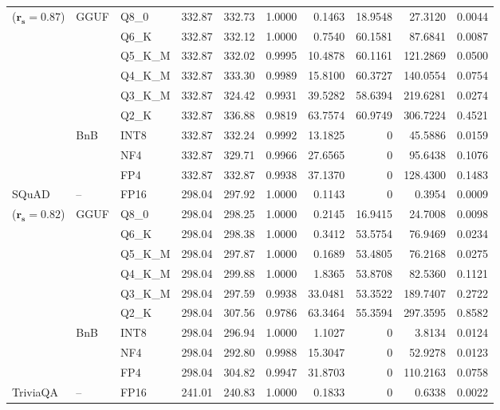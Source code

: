 \begin{longtable}{ll l rrrrrrr}
{\small ($\mathbf{r_s{=}0.87}$)} & GGUF & Q8\_0 & 332.87 & 332.73 & 1.0000 & 0.1463 & 18.9548 & 27.3120 & 0.0044 \\
 &  & Q6\_K & 332.87 & 332.12 & 1.0000 & 0.7540 & 60.1581 & 87.6841 & 0.0087 \\
 &  & Q5\_K\_M & 332.87 & 332.02 & 0.9995 & 10.4878 & 60.1161 & 121.2869 & 0.0500 \\
 &  & Q4\_K\_M & 332.87 & 333.30 & 0.9989 & 15.8100 & 60.3727 & 140.0554 & 0.0754 \\
 &  & Q3\_K\_M & 332.87 & 324.42 & 0.9931 & 39.5282 & 58.6394 & 219.6281 & 0.0274 \\
 &  & Q2\_K & 332.87 & 336.88 & 0.9819 & 63.7574 & 60.9749 & 306.7224 & 0.4521 \\
 & BnB & INT8 & 332.87 & 332.24 & 0.9992 & 13.1825 & \cellcolor{cyan!12} $0$ & 45.5886 & 0.0159 \\
 &  & NF4 & 332.87 & 329.71 & 0.9966 & 27.6565 & \cellcolor{cyan!12} $0$ & 95.6438 & 0.1076 \\
 &  & FP4 & 332.87 & 332.87 & 0.9938 & 37.1370 & \cellcolor{cyan!12} $0$ & 128.4300 & 0.1483 \\
\midrule
SQuAD & -- & FP16 & 298.04 & 297.92 & 1.0000 & 0.1143 & \cellcolor{cyan!12} $0$ & 0.3954 & 0.0009 \\
{\small ($\mathbf{r_s{=}0.82}$)} & GGUF & Q8\_0 & 298.04 & 298.25 & 1.0000 & 0.2145 & 16.9415 & 24.7008 & 0.0098 \\
 &  & Q6\_K & 298.04 & 298.38 & 1.0000 & 0.3412 & 53.5754 & 76.9469 & 0.0234 \\
 &  & Q5\_K\_M & 298.04 & 297.87 & 1.0000 & 0.1689 & 53.4805 & 76.2168 & 0.0275 \\
 &  & Q4\_K\_M & 298.04 & 299.88 & 1.0000 & 1.8365 & 53.8708 & 82.5360 & 0.1121 \\
 &  & Q3\_K\_M & 298.04 & 297.59 & 0.9938 & 33.0481 & 53.3522 & 189.7407 & 0.2722 \\
 &  & Q2\_K & 298.04 & 307.56 & 0.9786 & 63.3464 & 55.3594 & 297.3595 & 0.8582 \\
 & BnB & INT8 & 298.04 & 296.94 & 1.0000 & 1.1027 & \cellcolor{cyan!12} $0$ & 3.8134 & 0.0124 \\
 &  & NF4 & 298.04 & 292.80 & 0.9988 & 15.3047 & \cellcolor{cyan!12} $0$ & 52.9278 & 0.0123 \\
 &  & FP4 & 298.04 & 304.82 & 0.9947 & 31.8703 & \cellcolor{cyan!12} $0$ & 110.2163 & 0.0758 \\
\midrule
TriviaQA & -- & FP16 & 241.01 & 240.83 & 1.0000 & 0.1833 & \cellcolor{cyan!12} $0$ & 0.6338 & 0.0022 \\

\end{longtable}
